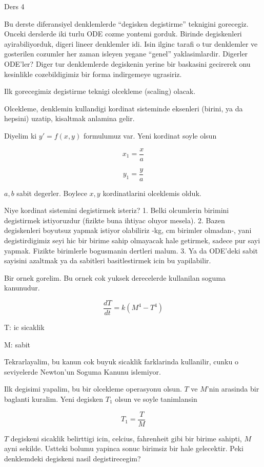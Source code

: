 \documentclass[12pt,fleqn]{article}\usepackage{../common}
\begin{document}
Ders 4

Bu derste diferansiyel denklemlerde ``degisken degistirme'' teknigini
gorecegiz. Onceki derslerde iki turlu ODE cozme yontemi
gorduk. Birinde degiskenleri ayirabiliyorduk, digeri lineer denklemler
idi. Isin ilginc tarafi o tur denklemler ve gosterilen cozumler her
zaman isleyen yegane ``genel'' yaklasimlardir. Digerler ODE'ler? Diger
tur denklemlerde degiskenin yerine bir baskasini gecirerek onu
kesinlikle cozebildigimiz bir forma indirgemeye ugrasiriz.

Ilk gorecegimiz degistirme teknigi olcekleme (scaling) olacak. 

Olcekleme, denklemin kullandigi kordinat sisteminde eksenleri (birini,
ya da hepsini) uzatip, kisaltmak anlamina gelir.

Diyelim ki $y' = f(x,y)$ formulumuz var. Yeni kordinat soyle olsun

\[ x_1 = \frac{x}{a} \]

\[ y_1 = \frac{y}{a} \]

$a,b$ sabit degerler. Boylece $x,y$ kordinatlarini olceklemis olduk.

Niye kordinat sistemini degistirmek isteriz? 1. Belki olcumlerin
birimini degistirmek istiyoruzdur (fizikte buna ihtiyac oluyor
mesela). 2. Bazen degiskenleri boyutsuz yapmak istiyor olabiliriz -kg,
cm birimler olmadan-, yani degistirdigimiz seyi hic bir birime sahip
olmayacak hale getirmek, sadece pur sayi yapmak. Fizikte birimlerle
bogusmanin dertleri malum. 3. Ya da ODE'deki sabit sayisini azaltmak
ya da sabitleri basitlestirmek icin bu yapilabilir.

Bir ornek gorelim. Bu ornek cok yuksek derecelerde kullanilan
soguma kanunudur. 

\[ \frac{dT}{dt} = k(M^4 - T^4) \]

T: ic sicaklik

M: sabit

Tekrarlayalim, bu kanun cok buyuk sicaklik farklarinda kullanilir,
cunku o seviyelerde Newton'un Soguma Kanunu islemiyor. 

Ilk degisimi yapalim, bu bir olcekleme operasyonu olsun. $T$ ve
$M$'nin arasinda bir baglanti kuralim. Yeni degisken $T_1$ olsun ve
soyle tanimlansin

\[ T_1 = \frac{T}{M} \]

$T$ degiskeni sicaklik belirttigi icin, celcius, fahrenheit gibi bir
birime sahipti, $M$ ayni sekilde. Ustteki bolumu yapinca sonuc
birimsiz bir hale gelecektir. Peki denklemdeki degiskeni nasil
degistirecegim? 
\end{document}
